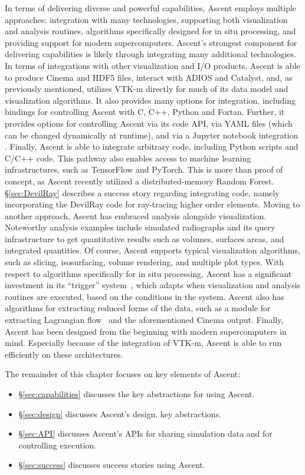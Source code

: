 In terms of delivering diverse and powerful capabilities,
Ascent employs multiple approaches:
integration with many technologies,
supporting both visualization and analysis routines,
algorithms specifically designed for in situ processing,
and providing support for modern supercomputers.
%
Ascent's strongest component for delivering capabilities is likely
through integrating many additional technologies.
%
In terms of integrations with other visualization and I/O products,
Ascent is able to produce Cinema and HDF5 files, interact with
ADIOS and Catalyst, and, as previously mentioned, utilizes VTK-m
directly for much of its data model and visualization algorithms.
%
It also provides many options for integration, including
bindings
for controlling Ascent with  C, C++, Python and Fortan.
%
Further, it provides options for controlling Ascent via its code API,
via YAML files (which can be changed dynamically at runtime), and via
a Jupyter notebook integration .
%
Finally, Ascent is able to integrate arbitrary code, including
Python scripts and C/C++ code.
%
This pathway also enables access to
machine learning infrastructures, such as TensorFlow and PyTorch.
%
This is more than proof of concept,
as Ascent recently utilized a distributed-memory Random Forest.
%
\S\ref{sec:DevilRay} describes a success story regarding integrating
code,
namely incorporating the DevilRay code for ray-tracing higher order
elements.
%
Moving to another approach, Ascent has embraced analysis alongside
visualization.
%
Noteworthy analysis examples include simulated radiographs and its
query infrastructure to get quantitative results such as volumes,
surfaces areas, and integrated quantities.
%
Of course, Ascent supports typical visualization algorithms, such as
slicing, isosurfacing, volume rendering, and multiple plot types.
%
With respect to algorithms specifically for in situ processing, Ascent
has a significant investment in its ``trigger'' system~\cite{Larsen:ISAV18},
which adapts when visualization and analysis routines are executed,
based on the conditions in the system.
%
Ascent also has algorithms for extracting reduced forms of the data,
such as a module for extracting Lagrangian flow~\cite{Agranovsky:LDAV2014,Sane:EGPGV19} and the
aforementioned Cinema output.
%
Finally, Ascent has been designed from the beginning with modern
supercomputers in mind.
%
Especially because of the integration of VTK-m, Ascent is able to
run efficiently on these architectures.

The remainder of this chapter focuses on key elements of Ascent:
\begin{itemize}
\item \S\ref{sec:capabilities} discusses the key abstractions for using Ascent.
\item \S\ref{sec:design} discusses Ascent's design.
key abstractions.
\item \S\ref{sec:API} discusses Ascent's APIs for sharing simulation
data and for controlling execution.
\item \S\ref{sec:success} discusses success stories using Ascent.
\end{itemize}

